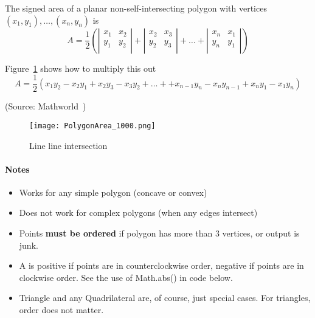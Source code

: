 The signed area of a planar non-self-intersecting polygon with vertices $(x_1, y_1), \dots, (x_n, y_n)$ is
\[
    A = \frac{1}{2} \left(
        \left\vert
        \begin{array}{cc}
            x_1 & x_2 \\
            y_1 & y_2 \\
        \end{array}
        \right\vert
        +
        \left\vert
        \begin{array}{cc}
            x_2 & x_3 \\
            y_2 & y_3 \\
        \end{array}
        \right\vert
        + \ldots +
        \left\vert
        \begin{array}{cc}
            x_n & x_1 \\
            y_n & y_1 \\
        \end{array}
        \right\vert
        \right)
\]

Figure~\ref{fig:polygonareadeterminant} shows how to multiply this out
\[
    A = \frac{1}{2} \left(
        x_1 y_2 - x_2 y_1
      + x_2 y_3 - x_3 y_2
      + \ldots +
      + x_{n-1} y_n - x_n y_{n-1}
      + x_{n} y_1 - x_1 y_n
      \right)
\]

(Source: Mathworld~\cite{mathworldpolygonarea})

\begin{figure}
    \centering
    \texttt{[image: PolygonArea\_1000.png]}
    \caption{Line line intersection}
    \label{fig:polygonareadeterminant}
\end{figure}

\paragraph{Notes}
\begin{itemize}
\item Works for any simple polygon (concave or convex)
\item Does not work for complex polygons (when any edges intersect)
\item Points \textbf{must be ordered} if polygon has more than 3 vertices, or output is junk.
\item A is positive if points are in counterclockwise order, negative if points are in clockwise order.
    See the use of Math.abs() in code below.
\item Triangle and any Quadrilateral are, of course, just special cases.
    For triangles, order does not matter.
\end{itemize}

